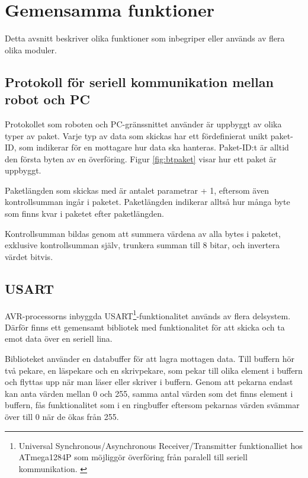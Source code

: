 \section{Gemensamma funktioner}
Detta avsnitt beskriver olika funktioner som inbegriper eller används av flera olika moduler.

\subsection{Protokoll för seriell kommunikation mellan robot och PC}
\label{sec:bt-protokoll}
Protokollet som roboten och PC-gränssnittet använder är uppbyggt av olika typer av paket. Varje typ av data som skickas har ett fördefinierat unikt paket-ID, som indikerar för en mottagare hur data ska hanteras. Paket-ID:t är alltid den första byten av en överföring. Figur \ref{fig:btpaket} visar hur ett paket är uppbyggt.


Paketlängden som skickas med är antalet parametrar + 1, eftersom även kontrollsumman ingår i paketet. Paketlängden indikerar alltså hur många byte som finns kvar i paketet efter paketlängden.

Kontrollsumman bildas genom att summera värdena av alla bytes i paketet, exklusive kontrollsumman själv, trunkera summan till 8 bitar, och invertera värdet bitvis.

\subsection{USART}
\label{sec:usart}
AVR-processorns inbyggda USART\footnote{Universal Synchronous/Asynchronous Receiver/Transmitter funktionalliet hos ATmega1284P som möjliggör överföring från paralell till seriell kommunikation. \cite{atmega1284}}-funktionalitet används av flera delsystem. Därför finns ett gemensamt bibliotek med funktionalitet för att skicka och ta emot data över en seriell lina.

Biblioteket använder en databuffer för att lagra mottagen data. Till buffern hör två pekare, en läspekare och en skrivpekare, som pekar till olika element i buffern och flyttas upp när man läser eller skriver i buffern. Genom att pekarna endast kan anta värden mellan 0 och 255, samma antal värden som det finns element i buffern, fås funktionalitet som i en ringbuffer eftersom pekarnas värden svämmar över till 0 när de ökas från 255.

